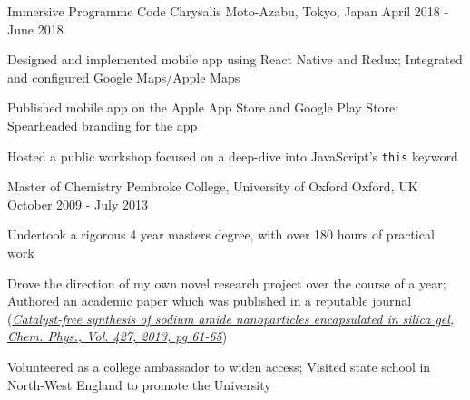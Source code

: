 
\begin{cventries}

  \cventry
  {Immersive Programme} %
  {Code Chrysalis} %
  {Moto-Azabu, Tokyo, Japan} %
  {April 2018 - June 2018} %
  {
    \begin{cvitems} %
      \item {Designed and implemented mobile app using React Native and Redux; Integrated and configured Google Maps/Apple Maps}
      \item {Published mobile app on the Apple App Store and Google Play Store; Spearheaded branding for the app}
      \item {Hosted a public workshop focused on a deep-dive into JavaScript's \texttt{this} keyword}
    \end{cvitems}
  }

  \cventry
  {Master of Chemistry} %
  {Pembroke College, University of Oxford} %
  {Oxford, UK} %
  {October 2009 - July 2013} %
  {
    \begin{cvitems} %
      \item {Undertook a rigorous 4 year masters degree, with over 180 hours of practical work}
      \item {Drove the direction of my own novel research project over the course of a year; Authored an academic paper which was published in a reputable journal (\href{https://doi.org/10.1016/j.chemphys.2013.06.003}{\textit{Catalyst-free synthesis of sodium amide nanoparticles encapsulated in silica gel, Chem. Phys., Vol. 427, 2013, pg 61-65}})}
      \item {Volunteered as a college ambassador to widen access; Visited state school in North-West England to promote the University}
    \end{cvitems}
  }

\end{cventries}
